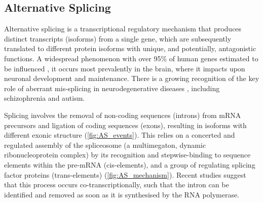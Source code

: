 

\subsection{Alternative Splicing}
Alternative splicing is a transcriptional regulatory mechanism that produces distinct transcripts (isoforms) from a single gene, which are subsequently translated to different protein isoforms with unique, and potentially, antagonistic functions\cite{Wang2008}. A widespread phenomenon with over 95\% of human genes estimated to be influenced \cite{Pan2008}, it occurs most prevalently in the brain, where it impacts upon neuronal development and maintenance\cite{Pan2008, Mazin2014, Raj2015}. There is a growing recognition of the key role of aberrant mis-splicing in neurodegenerative diseases \cite{Gandal2018,RL2019}, including schizophrenia and autism. 

Splicing involves the removal of non-coding sequences (introns) from mRNA precursors and ligation of coding sequences (exons), resulting in isoforms with different exonic structure (\cref{fig:AS_events}). This relies on a concerted and regulated assembly of the spliceosome (a multimegaton, dynamic ribonucleoprotein complex) by its recognition and stepwise-binding to sequence elements within the pre-mRNA (cis-elements), and a group of regulating splicing factor proteins (trans-elements) (\cref{fig:AS_mechanism}). Recent studies suggest that this process occurs co-transcriptionally, such that the intron can be identified and removed as soon as it is synthesised by the RNA polymerase. 

